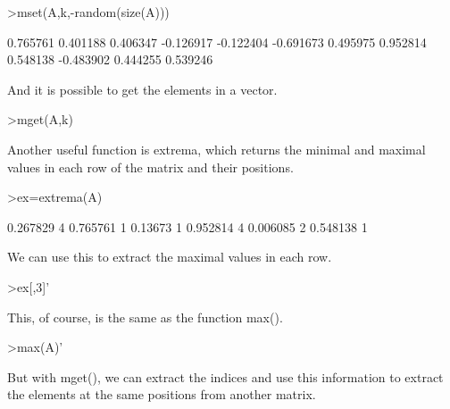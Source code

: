 \documentclass{article}
\begin{document}
\begin{eulernotebook}
\begin{eulercomment}
\begin{eulercomment}
\begin{eulercomment}
\begin{eulercomment}
\begin{eulerprompt}
>mset(A,k,-random(size(A)))
\end{eulerprompt}
\begin{euleroutput}
       0.765761      0.401188      0.406347     -0.126917 
      -0.122404     -0.691673      0.495975      0.952814 
       0.548138     -0.483902      0.444255      0.539246 
\end{euleroutput}
\begin{eulercomment}
And it is possible to get the elements in a vector.
\end{eulercomment}
\begin{eulerprompt}
>mget(A,k)
\end{eulerprompt}
\begin{euleroutput}
  [0.267829,  0.13673,  0.390567,  0.006085]
\end{euleroutput}
\begin{eulercomment}
Another useful function is extrema, which returns the minimal and
maximal values in each row of the matrix and their positions.
\end{eulercomment}
\begin{eulerprompt}
>ex=extrema(A)
\end{eulerprompt}
\begin{euleroutput}
       0.267829             4      0.765761             1 
        0.13673             1      0.952814             4 
       0.006085             2      0.548138             1 
\end{euleroutput}
\begin{eulercomment}
We can use this to extract the maximal values in each row.
\end{eulercomment}
\begin{eulerprompt}
>ex[,3]'
\end{eulerprompt}
\begin{euleroutput}
  [0.765761,  0.952814,  0.548138]
\end{euleroutput}
\begin{eulercomment}
This, of course, is the same as the function max().
\end{eulercomment}
\begin{eulerprompt}
>max(A)'
\end{eulerprompt}
\begin{euleroutput}
  [0.765761,  0.952814,  0.548138]
\end{euleroutput}
\begin{eulercomment}
But with mget(), we can extract the indices and use this information
to extract the elements at the same positions from another matrix.

\end{eulercomment}
\end{eulercomment}
\end{eulercomment}
\end{eulercomment}
\end{eulercomment}
\end{eulernotebook}
\end{document}
